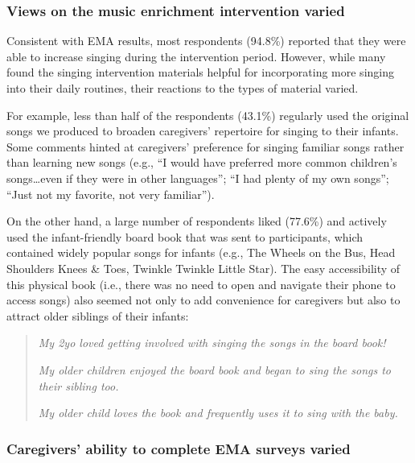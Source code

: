 \documentclass[
]{article}
\begin{document}
\subsubsection*{Views on the music enrichment intervention
varied}\label{views-on-the-music-enrichment-intervention-varied}

Consistent with EMA results, most respondents (94.8\%) reported that
they were able to increase singing during the intervention period.
However, while many found the singing intervention materials helpful for
incorporating more singing into their daily routines, their reactions to
the types of material varied.

For example, less than half of the respondents (43.1\%) regularly used
the original songs we produced to broaden caregivers' repertoire for
singing to their infants. Some comments hinted at caregivers' preference
for singing familiar songs rather than learning new songs (e.g., ``I
would have preferred more common children's songs\ldots even if they
were in other languages''; ``I had plenty of my own songs''; ``Just not
my favorite, not very familiar'').

On the other hand, a large number of respondents liked (77.6\%) and
actively used the infant-friendly board book that was sent to
participants, which contained widely popular songs for infants (e.g.,
The Wheels on the Bus, Head Shoulders Knees \& Toes, Twinkle Twinkle
Little Star). The easy accessibility of this physical book (i.e., there
was no need to open and navigate their phone to access songs) also
seemed not only to add convenience for caregivers but also to attract
older siblings of their infants:

\begin{quote}
\textit{My 2yo loved getting involved with singing the songs in the board book!}
  
\textit{My older children enjoyed the board book and began to sing the songs to their sibling too.}
  
\textit{My older child loves the book and frequently uses it to sing with the baby.}
\end{quote}

\subsubsection*{Caregivers' ability to complete EMA surveys
varied}\label{caregivers-ability-to-complete-ema-surveys-varied}
\end{document}
